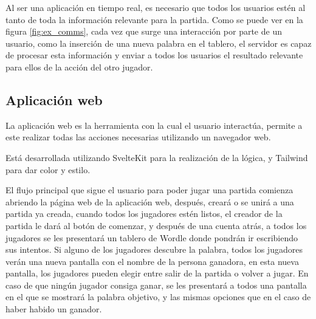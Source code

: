 Al ser una aplicación en tiempo real, es necesario que todos los usuarios estén al tanto de toda la información relevante para la partida. Como se puede ver en la figura \ref{fig:ex_comms}, cada vez que surge una interacción por parte de un usuario, como la inserción de una nueva palabra en el tablero, el servidor es capaz de procesar esta información y enviar a todos los usuarios el resultado relevante para ellos de la acción del otro jugador.


\subsection{Aplicación web}
La aplicación web es la herramienta con la cual el usuario interactúa, permite a este realizar todas las acciones necesarias utilizando un navegador web.

Está desarrollada utilizando SvelteKit para la realización de la lógica, y Tailwind para dar color y estilo.

El flujo principal que sigue el usuario para poder jugar una partida comienza abriendo la página web de la aplicación web, después, creará o se unirá a una partida ya creada, cuando todos los jugadores estén listos, el creador de la partida le dará al botón de comenzar, y después de una cuenta atrás, a todos los jugadores se les presentará un tablero de Wordle donde pondrán ir escribiendo sus intentos. Si alguno de los jugadores descubre la palabra, todos los jugadores verán una nueva pantalla con el nombre de la persona ganadora, en esta nueva pantalla, los jugadores pueden elegir entre salir de la partida o volver a jugar. En caso de que ningún jugador consiga ganar, se les presentará a todos una pantalla en el que se mostrará la palabra objetivo, y las mismas opciones que en el caso de haber habido un ganador.


